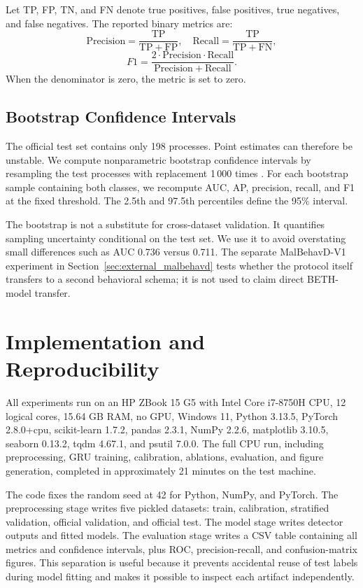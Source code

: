 \documentclass[10pt,journal,compsoc]{IEEEtran}
\begin{document}
Let TP, FP, TN, and FN denote true positives, false positives, true negatives, and false negatives. The reported binary metrics are:
\[
\mathrm{Precision} = \frac{\mathrm{TP}}{\mathrm{TP}+\mathrm{FP}},
\quad
\mathrm{Recall} = \frac{\mathrm{TP}}{\mathrm{TP}+\mathrm{FN}},
\]
\[
F1 = \frac{2\cdot \mathrm{Precision}\cdot \mathrm{Recall}}{\mathrm{Precision}+\mathrm{Recall}}.
\]
When the denominator is zero, the metric is set to zero.

\subsection{Bootstrap Confidence Intervals}

The official test set contains only 198 processes. Point estimates can therefore be unstable. We compute nonparametric bootstrap confidence intervals by resampling the test processes with replacement 1\,000 times \cite{efron1994}. For each bootstrap sample containing both classes, we recompute AUC, AP, precision, recall, and F1 at the fixed threshold. The 2.5th and 97.5th percentiles define the 95\% interval.

The bootstrap is not a substitute for cross-dataset validation. It quantifies sampling uncertainty conditional on the test set. We use it to avoid overstating small differences such as AUC 0.736 versus 0.711. The separate MalBehavD-V1 experiment in Section~\ref{sec:external_malbehavd} tests whether the protocol itself transfers to a second behavioral schema; it is not used to claim direct BETH-model transfer.

\section{Implementation and Reproducibility}
\label{sec:implementation}

All experiments run on an HP ZBook 15 G5 with Intel Core i7-8750H CPU, 12 logical cores, 15.64 GB RAM, no GPU, Windows 11, Python 3.13.5, PyTorch 2.8.0+cpu, scikit-learn 1.7.2, pandas 2.3.1, NumPy 2.2.6, matplotlib 3.10.5, seaborn 0.13.2, tqdm 4.67.1, and psutil 7.0.0. The full CPU run, including preprocessing, GRU training, calibration, ablations, evaluation, and figure generation, completed in approximately 21 minutes on the test machine.

The code fixes the random seed at 42 for Python, NumPy, and PyTorch. The preprocessing stage writes five pickled datasets: train, calibration, stratified validation, official validation, and official test. The model stage writes detector outputs and fitted models. The evaluation stage writes a CSV table containing all metrics and confidence intervals, plus ROC, precision-recall, and confusion-matrix figures. This separation is useful because it prevents accidental reuse of test labels during model fitting and makes it possible to inspect each artifact independently.
\end{document}
